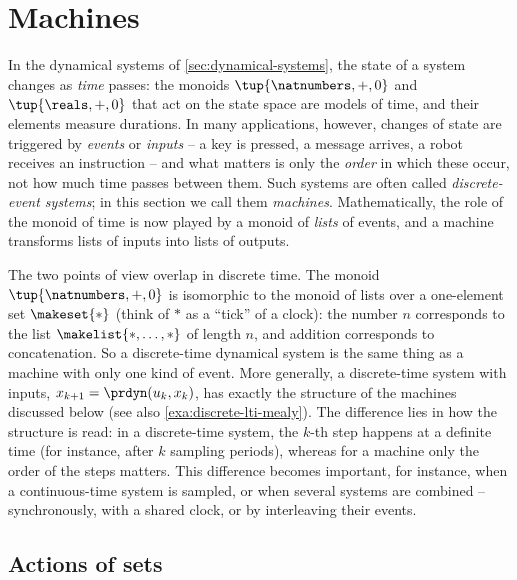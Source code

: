 
\section{Machines}
\label{sec:machines}

In the dynamical systems of \cref{sec:dynamical-systems}, the state of a system changes as \emph{time} passes: the monoids $\tup{\natnumbers, +, 0}$ and $\tup{\reals, +, 0}$ that act on the state space are models of time, and their elements measure durations.
In many applications, however, changes of state are triggered by \emph{events} or \emph{inputs} -- a key is pressed, a message arrives, a robot receives an instruction -- and what matters is only the \emph{order} in which these occur, not how much time passes between them.
Such systems are often called \emph{discrete-event systems}; in this section we call them \emph{machines}.
Mathematically, the role of the monoid of time is now played by a monoid of \emph{lists} of events, and a machine transforms lists of inputs into lists of outputs.

\begin{remark}
    \label{rem:machines-vs-dynamical-systems}
    The two points of view overlap in discrete time.
    The monoid $\tup{\natnumbers, +, 0}$ is isomorphic to the monoid of lists over a one-element set $\makeset{\ast}$ (think of $\ast$ as a ``tick'' of a clock): the number $n$ corresponds to the list $\makelist{\ast, \dots, \ast}$ of length $n$, and addition corresponds to concatenation.
    So a discrete-time dynamical system is the same thing as a machine with only one kind of event.
    More generally, a discrete-time system with inputs, $x_{k+1} = \prdyn(u_k, x_k)$, has exactly the structure of the machines discussed below (see also \cref{exa:discrete-lti-mealy}).
    The difference lies in how the structure is read: in a discrete-time system, the $k$-th step happens at a definite time (for instance, after $k$ sampling periods), whereas for a machine only the order of the steps matters.
    This difference becomes important, for instance, when a continuous-time system is sampled, or when several systems are combined -- synchronously, with a shared clock, or by interleaving their events.
\end{remark}

\subsection{Actions of sets}
\label{sec:actions-of-sets}

